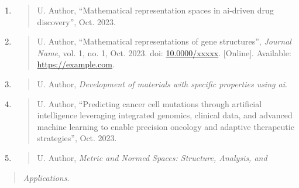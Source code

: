 \documentclass[
]{article}
\begin{document}
\begin{enumerate}
\def\labelenumi{\arabic{enumi}.}
\item
  \begin{quote}
  \protect\hypertarget{_bookmark41}{}{}U. Author, ``Mathematical
  representation spaces in ai-driven drug discovery'', Oct. 2023.
  \end{quote}
\item
  \begin{quote}
  \protect\hypertarget{_bookmark42}{}{}U. Author, ``Mathematical
  representations of gene structures'', \emph{Journal Name}, vol. 1, no.
  1, Oct. 2023. doi:
  \href{https://doi.org/10.0000/xxxxx}{10.0000/xxxxx}. {[}Online{]}.
  Available: \href{https://example.com/}{https://example.com}.
  \end{quote}
\item
  \begin{quote}
  \protect\hypertarget{_bookmark43}{}{}U. Author, \emph{Development of
  materials with specific properties using ai}.
  \end{quote}
\item
  \begin{quote}
  \protect\hypertarget{_bookmark44}{}{}U. Author, ``Predicting cancer
  cell mutations through artificial intelligence leveraging integrated
  genomics, clinical data, and advanced machine learning to enable
  precision oncology and adaptive therapeutic strategies'', Oct. 2023.
  \end{quote}
\item
  \begin{quote}
  \protect\hypertarget{_bookmark45}{}{}U. Author, \emph{Metric and
  Normed Spaces: Structure, Analysis, and}
  \end{quote}
\end{enumerate}

\begin{quote}
\emph{Applications}.
\end{quote}
\end{document}
